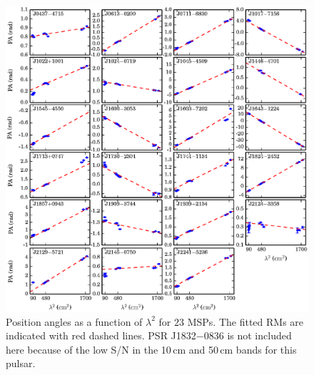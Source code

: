 \documentclass[useAMS,usenatbib]{mn2e}
\begin{document}
\begin{figure}
\begin{center}
\includegraphics[width=6 in]{rm.ps}
\caption{Position angles as a function of $\lambda^2$ for $23$ MSPs. The fitted RMs 
are indicated with red dashed lines. PSR J1832$-$0836 is not included here because of the 
low S/N in the 10\,cm and 50\,cm bands for this pulsar.
} 
\label{rmFreq}
\end{center}
\end{figure}
\end{document}
